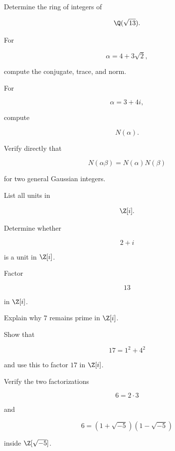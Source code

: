 \begin{exercise}[1]
Determine the ring of integers of

\[ \Q(\sqrt{13}). \]
\end{exercise}

\begin{exercise}[2]
For

\[ \alpha=4+3\sqrt2, \]

compute the conjugate, trace, and norm.
\end{exercise}

\begin{exercise}[2]
For

\[ \alpha=3+4i, \]

compute

\[ N(\alpha). \]
\end{exercise}

\begin{exercise}[2]
Verify directly that

\[ N(\alpha\beta)=N(\alpha)N(\beta) \]

for two general Gaussian integers.
\end{exercise}

\begin{exercise}[1]
List all units in

\[ \Z[i]. \]
\end{exercise}

\begin{exercise}[2]
Determine whether

\[ 2+i \]

is a unit in \(\Z[i]\).
\end{exercise}

\begin{exercise}[2]
Factor

\[ 13 \]

in \(\Z[i]\).
\end{exercise}

\begin{exercise}[2]
Explain why \(7\) remains prime in \(\Z[i]\).
\end{exercise}

\begin{exercise}[2]
Show that

\[ 17=1^2+4^2 \]

and use this to factor \(17\) in \(\Z[i]\).
\end{exercise}

\begin{exercise}[3]
Verify the two factorizations

\[ 6=2\cdot3 \]

and

\[ 6=(1+\sqrt{-5})(1-\sqrt{-5}) \]

inside \(\Z[\sqrt{-5}]\).
\end{exercise}

